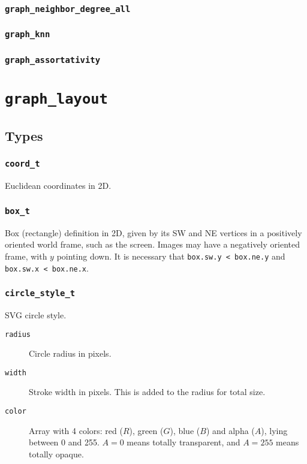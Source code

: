 \documentclass[a4paper,10pt]{article}
\begin{document}
\subsubsection{\texttt{graph\_neighbor\_degree\_all}}
\subsubsection{\texttt{graph\_knn}}
\subsubsection{\texttt{graph\_assortativity}}

\section{\texttt{graph\_layout}}

\subsection{Types}

\subsubsection{\texttt{coord\_t}}

Euclidean coordinates in 2D.

\subsubsection{\texttt{box\_t}}

Box (rectangle) definition in 2D, given by its SW and NE vertices in a 
positively oriented world frame, such as the screen. Images may have
a negatively oriented frame, with $y$ pointing down.
It is necessary that \texttt{box.sw.y < box.ne.y} and \texttt{box.sw.x < box.ne.x}.

\subsubsection{\texttt{circle\_style\_t}}

SVG circle style.

\begin{description}
 \item[\texttt{radius}] Circle radius in pixels.
 \item[\texttt{width}] Stroke width in pixels. This is added to the radius for total
 size.
 \item[\texttt{color}] Array with 4 colors: red ($R$), green ($G$), blue ($B$) and 
  alpha ($A$), lying between 0 and 255. $A=0$ means totally transparent, and 
  $A = 255$ means totally opaque.
\end{description}
\end{document}
